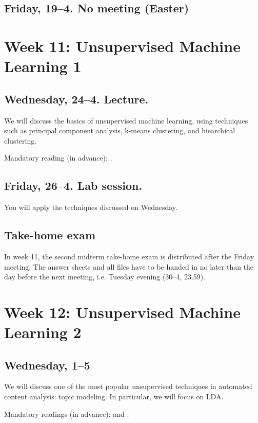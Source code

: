 \subsection*{Friday, 19--4. No meeting (Easter)}




\section*{Week 11: Unsupervised Machine Learning 1}

\subsection*{Wednesday, 24--4. Lecture.}
We will discuss the basics of unsupervised machine learning, using techniques such as principal component analysis, k-means clustering, and hiearchical clustering.

Mandatory reading (in advance): \cite{burscher2016}.

\subsection*{Friday, 26--4. Lab session.}
You will apply the techniques discussed on Wednesday.


\subsection*{Take-home exam}
In week 11, the second midterm take-home exam is distributed after the Friday meeting. The answer sheets and all files have to be handed in no later than the day before the next meeting, i.e. Tuesday evening (30--4, 23.59).






\section*{Week 12: Unsupervised Machine Learning 2}


\subsection*{Wednesday, 1--5}
We will discuss one of the most popular unsupervised techniques in automated content analysis: topic modeling. In particular, we will focus on LDA.

Mandatory readings (in advance): \cite{Maier2018a} and \cite{Tsur2015}. 

